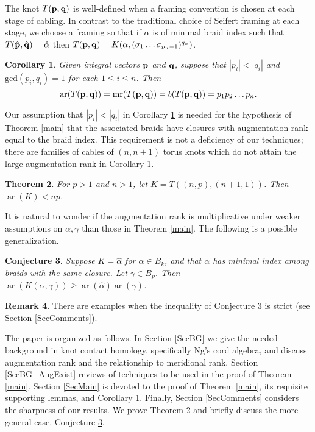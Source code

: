 \documentclass[11pt]{amsart}
\def\s{{\sigma}}
\def\ar{\operatorname{ar}}
\def\mr{\operatorname{mr}}
\newtheorem{thm}{Theorem}[section]
\newtheorem{cor}[thm]{Corollary}
\newtheorem{conj}[thm]{Conjecture}
\theoremstyle{definition}
\newtheorem{rem}[thm]{Remark}
\begin{document}
The knot $T({\bf p},{\bf q})$ is well-defined when a framing convention is chosen at each stage of cabling. In contrast to the traditional choice of Seifert framing at each stage, we choose a framing so that if $\alpha$ is of minimal braid index such that $T(\hat{\bf p},\hat{\bf q}) = \hat{\alpha}$ then $T({\bf p},{\bf q}) = K(\alpha,(\s_1\ldots\s_{p_n-1})^{q_n})$.

\begin{cor}\label{cor:iteratedCables}
Given integral vectors ${\bf p}$ and ${\bf q}$, suppose that $|p_i|<|q_i|$ and $\text{gcd}(p_i,q_i)=1$ for each $1\le i\le n$. Then 
      \[\ar(T({\bf p},{\bf q}))=\mr(T({\bf p},{\bf q})) = b(T({\bf p},{\bf q}))=p_1p_2\ldots p_n.\]
\end{cor}

Our assumption that $|p_i|<|q_i|$ in Corollary \ref{cor:iteratedCables} is needed for the hypothesis of Theorem \ref{main} that the associated braids have closures with augmentation rank equal to the braid index. This requirement is not a deficiency of our techniques; there are families of cables of $(n,n+1)$ torus knots which do not attain the large augmentation rank in Corollary \ref{cor:iteratedCables}.

\begin{thm}\label{ThmNNPlus1}For $p>1$ and $n>1$, let $K=T((n,p),(n+1,1))$. Then $\ar(K) < np$.
\end{thm}

It is natural to wonder if the augmentation rank is multiplicative under weaker assumptions on $\alpha, \gamma$ than those in Theorem \ref{main}. The following is a possible generalization.

\begin{conj}Suppose $K=\hat{\alpha}$ for $\alpha\in B_k$, and that $\alpha$ has minimal index among braids with the same closure. Let $\gamma\in B_p$. Then $\ar(K(\alpha,\gamma)) \ge \ar(\hat{\alpha})\ar(\hat{\gamma})$.
\label{ConjSuperMultipl}
\end{conj}

\begin{rem}There are examples when the inequality of Conjecture \ref{ConjSuperMultipl} is strict (see Section \ref{SecComments}).
\label{RemStrictlySuper}
\end{rem}

The paper is organized as follows. In Section \ref{SecBG} we give the needed background in knot contact homology, specifically Ng's cord algebra, and discuss augmentation rank and the relationship to meridional rank. Section \ref{SecBG_AugExist} reviews of techniques to be used in the proof of Theorem \ref{main}. Section \ref{SecMain} is devoted to the proof of Theorem \ref{main}, its requisite supporting lemmas, and Corollary \ref{cor:iteratedCables}. Finally, Section \ref{SecComments} considers the sharpness of our results. We prove Theorem \ref{ThmNNPlus1} and briefly discuss the more general case, Conjecture \ref{ConjSuperMultipl}.
\end{document}
